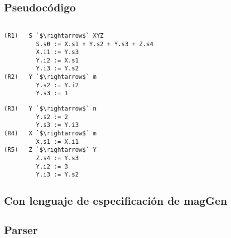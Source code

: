 \documentclass[runningheads,a4paper]{llncs}
\newcommand{\maggen}{\textbf{magGen}}
\begin{document}
\subsection{Pseudocódigo}
\begin{minipage}{0.45\textwidth}
\begin{center} 
\begin{lstlisting}[columns=fullflexible, backgroundcolor=\color{white}]

(R1)   S `$\rightarrow$` XYZ      
         S.s0 := X.s1 + Y.s2 + Y.s3 + Z.s4
         X.i1 := Y.s3  
         Y.i2 := X.s1
         Y.i3 := Y.s2
(R2)   Y `$\rightarrow$` m        
         Y.s2 := Y.i2
         Y.s3 := 1

\end{lstlisting} 
\end{center}
\end{minipage}
\hspace{0.6cm}\begin{minipage}{0.45\textwidth}
\begin{center}
\begin{lstlisting}[columns=fullflexible, backgroundcolor=\color{white}]
(R3)   Y `$\rightarrow$` n        
         Y.s2 := 2
         Y.s3 := Y.i3
(R4)   X `$\rightarrow$` m        
         X.s1 := X.i1
(R5)   Z `$\rightarrow$` Y        
         Z.s4 := Y.s3
         Y.i2 := 3
         Y.i3 := Y.s2
\end{lstlisting} 
\end{center}
\end{minipage}

\subsection{Con lenguaje de especificación de \maggen}
\begin{minipage}{0.45\textwidth}
  \begin{center}

  \end{center}
\end{minipage}
\hspace{0.6cm}\begin{minipage}{0.45\textwidth}
  \begin{center}

  \end{center}
\end{minipage}

\subsection{Parser}
\end{document}
